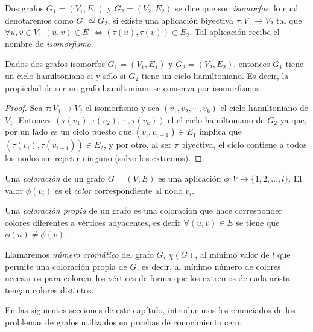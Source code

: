 \begin{definition}
	Dos grafos $G_1 = (V_1, E_1)$ y $G_2 = (V_2, E_2)$ se dice que son \textit{isomorfos},
	lo cual denotaremos como $G_1 \simeq G_2$, si existe una aplicación biyectiva
	$\tau : V_1 \rightarrow V_2$ tal que $\forall u,v \in V_1$
	$(u,v) \in E_1 \Leftrightarrow (\tau(u), \tau(v)) \in E_2 $.
	Tal aplicación recibe el nombre de \textit{isomorfismo}.
\end{definition}

\begin{proposition}
Dados dos grafos isomorfos $G_1 = (V_1,E_1)$ y $G_2 = (V_2,E_2)$, entonces $G_1$
tiene un ciclo hamiltoniano si y s\'olo si $G_2$ tiene un ciclo hamiltoniano. Es
decir, la propiedad de ser un grafo hamiltoniano se conserva por isomorfismos.
\end{proposition}
\begin{proof}
Sea $\tau : V_1 \to V_2$ el isomorfismo y sea $(v_1,v_2,\cdots,v_k)$ el ciclo
hamiltoniano de $V_1$. Entonces $(\tau(v_1),\tau(v_2),\cdots,\tau(v_k))$ el el
ciclo hamiltoniano de $G_2$ ya que, por un lado es un ciclo puesto que
$(v_i,v_{i+1}) \in E_1$ implica que $(\tau(v_i),\tau(v_{i+1}))\in E_2$,
y por otro, al ser $\tau$ biyectiva, el ciclo contiene a todos los nodos
sin repetir ninguno (salvo los extremos).
\end{proof}

\begin{definition}
	Una \textit{coloración} de un grafo $G=(V,E)$ es una aplicación $\phi:V\rightarrow
	\{1,2,\dots , l\}$. El valor $\phi(v_i)$ es el \textit{color} correspondiente al
	nodo $v_i$.
\end{definition}

\begin{definition}
	Una \textit{coloración propia} de un grafo es una coloración que hace corresponder
	colores diferentes a vértices adyacentes, es decir
	$\forall (u,v)\in E$ se tiene que $\phi(u)\neq \phi(v)$.
\end{definition}


\begin{definition}
	Llamaremos \textit{número cromático} del grafo $G$, $\chi(G)$, al mínimo valor
	de $l$ que permite una coloración propia de $G$, es decir, al mínimo número de
	colores necesarios para colorear los vértices de forma que los extremos de cada
	arista tengan colores distintos.
\end{definition}

En las siguientes secciones de este cap\'itulo,
introducimos los enunciados de los problemas de grafos
utilizados en pruebas de conocimiento cero.

